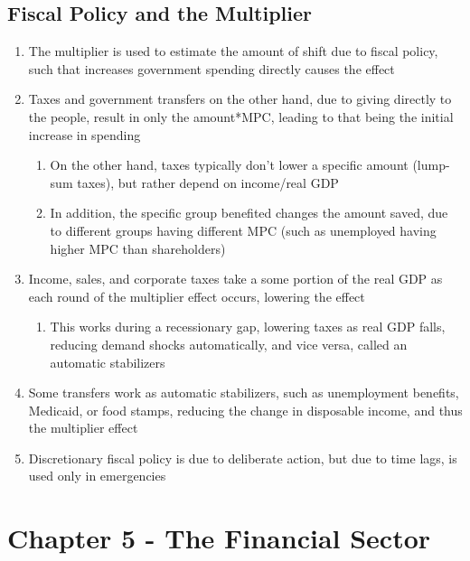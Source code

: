 \documentclass[11 pt, twoside]{article}
\begin{document}
\subsection{Fiscal Policy and the Multiplier}
\begin{enumerate}
\item The multiplier is used to estimate the amount of shift due to fiscal policy, such that increases government spending directly causes the effect
\item Taxes and government transfers on the other hand, due to giving directly to the people, result in only the amount*MPC, leading to that being the initial increase in spending
\begin{enumerate}
\item On the other hand, taxes typically don't lower a specific amount (lump-sum taxes), but rather depend on income/real GDP
\item In addition, the specific group benefited changes the amount saved, due to different groups having different MPC (such as unemployed having higher MPC than shareholders)
\end{enumerate}
\item Income, sales, and corporate taxes take a some portion of the real GDP as each round of the multiplier effect occurs, lowering the effect
\begin{enumerate}
\item This works during a recessionary gap, lowering taxes as real GDP falls, reducing demand shocks automatically, and vice versa, called an automatic stabilizers
\end{enumerate}
\item Some transfers work as automatic stabilizers, such as unemployment benefits, Medicaid, or food stamps, reducing the change in disposable income, and thus the multiplier effect
\item Discretionary fiscal policy is due to deliberate action, but due to time lags, is used only in emergencies
\end{enumerate}

\section{Chapter 5 - The Financial Sector}
\end{document}
